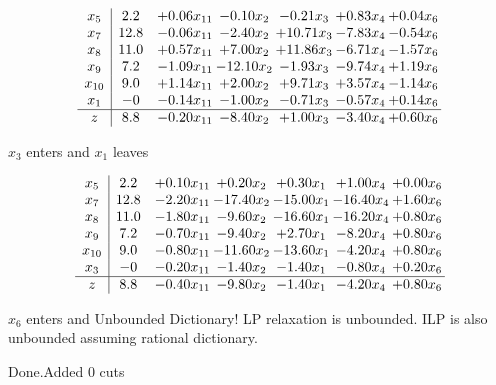 \documentclass[8pt]{article}
\begin{document}
 \[\begin{array}{c| c c@{\hskip 2pt} c@{\hskip 2pt} c@{\hskip 2pt} c@{\hskip 2pt} c@{\hskip 2pt} }
 x_{5}   &  2.2 & +  0.06 x_{11} & -0.10 x_{2} & -0.21 x_{3} & +  0.83 x_{4} & +  0.04 x_{6}\\
 x_{7}   &  12.8 & -0.06 x_{11} & -2.40 x_{2} & + 10.71 x_{3} & -7.83 x_{4} & -0.54 x_{6}\\
 x_{8}   &  11.0 & +  0.57 x_{11} & +  7.00 x_{2} & + 11.86 x_{3} & -6.71 x_{4} & -1.57 x_{6}\\
 x_{9}   &  7.2 & -1.09 x_{11} & -12.10 x_{2} & -1.93 x_{3} & -9.74 x_{4} & +  1.19 x_{6}\\
 x_{10}   &  9.0 & +  1.14 x_{11} & +  2.00 x_{2} & +  9.71 x_{3} & +  3.57 x_{4} & -1.14 x_{6}\\
 x_{1}   &  -0 & -0.14 x_{11} & -1.00 x_{2} & -0.71 x_{3} & -0.57 x_{4} & +  0.14 x_{6}\\
\hline
z    &  8.8 & -0.20 x_{11} & -8.40 x_{2} & +  1.00 x_{3} & -3.40 x_{4} & +  0.60 x_{6}\\
\end{array}\]


 $ x_{3} $ enters and $ x_{1} $ leaves 

 \[\begin{array}{c| c c@{\hskip 2pt} c@{\hskip 2pt} c@{\hskip 2pt} c@{\hskip 2pt} c@{\hskip 2pt} }
 x_{5}   &  2.2 & +  0.10 x_{11} & +  0.20 x_{2} & +  0.30 x_{1} & +  1.00 x_{4} & +  0.00 x_{6}\\
 x_{7}   &  12.8 & -2.20 x_{11} & -17.40 x_{2} & -15.00 x_{1} & -16.40 x_{4} & +  1.60 x_{6}\\
 x_{8}   &  11.0 & -1.80 x_{11} & -9.60 x_{2} & -16.60 x_{1} & -16.20 x_{4} & +  0.80 x_{6}\\
 x_{9}   &  7.2 & -0.70 x_{11} & -9.40 x_{2} & +  2.70 x_{1} & -8.20 x_{4} & +  0.80 x_{6}\\
 x_{10}   &  9.0 & -0.80 x_{11} & -11.60 x_{2} & -13.60 x_{1} & -4.20 x_{4} & +  0.80 x_{6}\\
 x_{3}   &  -0 & -0.20 x_{11} & -1.40 x_{2} & -1.40 x_{1} & -0.80 x_{4} & +  0.20 x_{6}\\
\hline
z    &  8.8 & -0.40 x_{11} & -9.80 x_{2} & -1.40 x_{1} & -4.20 x_{4} & +  0.80 x_{6}\\
\end{array}\]


 $ x_{6} $ enters and Unbounded Dictionary!
 LP relaxation is unbounded. ILP is also unbounded assuming rational dictionary. 

Done.Added 0 cuts 
\end{document}

